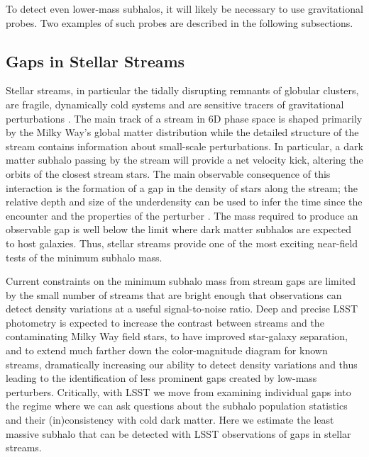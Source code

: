 To detect even lower-mass subhalos, it will likely be necessary to use gravitational probes. Two examples of such probes are described in the following subsections. 




\subsection{Gaps in Stellar Streams }
\label{sec:stream_gaps}


Stellar streams, in particular the tidally disrupting remnants of globular clusters, are fragile, dynamically cold systems and are sensitive tracers of gravitational perturbations \citep[][]{Carlberg:2012}.
The main track of a stream in 6D phase space is shaped primarily by the Milky Way's global matter distribution while the detailed structure of the stream contains information about small-scale perturbations. 
In particular, a dark matter subhalo passing by the stream will provide a net velocity kick, altering the orbits of the closest stream stars.
The main observable consequence of this interaction is the formation of a gap in the density of stars along the stream; the relative depth and size of the underdensity can be used to infer the time since the encounter and the properties of the perturber \citep{Carlberg:2012, Erkal:2015}. The mass required to produce an observable gap \citep[$10^5-10^6 M_\odot$,][]{erkal2016,bovy:2017} is well below the limit where dark matter subhalos are expected to host galaxies. Thus, stellar streams provide one of the most exciting near-field tests of the minimum subhalo mass.

Current constraints on the minimum subhalo mass from stream gaps are limited by the small number of streams that are bright enough that observations can detect density variations at a useful signal-to-noise ratio. Deep and precise LSST photometry is expected to increase the contrast between streams and the contaminating Milky Way field stars, to have improved star-galaxy separation, and to extend much farther down the color-magnitude diagram for known streams, dramatically increasing our ability to detect density variations and thus leading to the identification of less prominent gaps created by low-mass perturbers. Critically, with LSST we move from examining individual gaps into the regime where we can ask questions about the subhalo population statistics and their (in)consistency with cold dark matter.
Here we estimate the least massive subhalo that can be detected with LSST observations of gaps in stellar streams.

